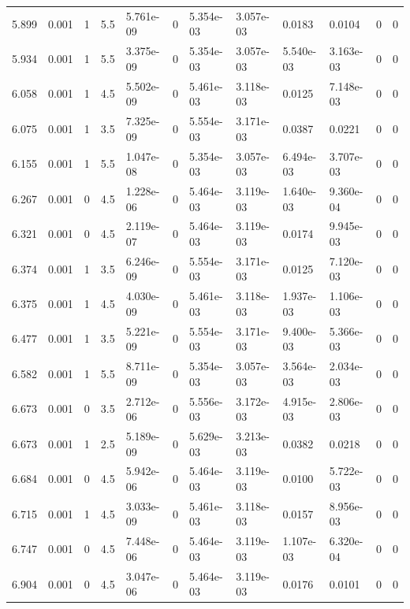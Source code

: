\documentclass[preview]{standalone}
\begin{document}
{{{\begin{tabular}{L{1.2cm}C{1.2cm} C{0.3cm}C{0.5cm} C{1.4cm}C{1.4cm} C{1.4cm}C{1.4cm} C{1.6cm}C{1.6cm} C{1.6cm}C{1.6cm}}
  5.899  &  0.001  & 1     & 5.5 &  5.761e-09  & 0  &  5.354e-03&   3.057e-03& 0.0183 & 0.0104   &  0 & 0  \\ 
  5.934  &  0.001  & 1     & 5.5 &  3.375e-09  & 0  &  5.354e-03&   3.057e-03& 5.540e-03 & 3.163e-03   &  0 & 0  \\ 
  6.058  &  0.001  & 1     & 4.5 &  5.502e-09  & 0  &  5.461e-03&   3.118e-03& 0.0125 & 7.148e-03   &  0 & 0  \\ 
  6.075  &  0.001  & 1     & 3.5 &  7.325e-09  & 0  &  5.554e-03&   3.171e-03& 0.0387 & 0.0221   &  0 & 0  \\ 
  6.155  &  0.001  & 1     & 5.5 &  1.047e-08  & 0  &  5.354e-03&   3.057e-03& 6.494e-03 & 3.707e-03   &  0 & 0  \\ 
  6.267  &  0.001  & 0     & 4.5 &  1.228e-06  & 0  &  5.464e-03&   3.119e-03& 1.640e-03 & 9.360e-04   &  0 & 0  \\ 
  6.321  &  0.001  & 0     & 4.5 &  2.119e-07  & 0  &  5.464e-03&   3.119e-03& 0.0174 & 9.945e-03   &  0 & 0  \\ 
  6.374  &  0.001  & 1     & 3.5 &  6.246e-09  & 0  &  5.554e-03&   3.171e-03& 0.0125 & 7.120e-03   &  0 & 0  \\ 
  6.375  &  0.001  & 1     & 4.5 &  4.030e-09  & 0  &  5.461e-03&   3.118e-03& 1.937e-03 & 1.106e-03   &  0 & 0  \\ 
  6.477  &  0.001  & 1     & 3.5 &  5.221e-09  & 0  &  5.554e-03&   3.171e-03& 9.400e-03 & 5.366e-03   &  0 & 0  \\ 
  6.582  &  0.001  & 1     & 5.5 &  8.711e-09  & 0  &  5.354e-03&   3.057e-03& 3.564e-03 & 2.034e-03   &  0 & 0  \\ 
  6.673  &  0.001  & 0     & 3.5 &  2.712e-06  & 0  &  5.556e-03&   3.172e-03& 4.915e-03 & 2.806e-03   &  0 & 0  \\ 
  6.673  &  0.001  & 1     & 2.5 &  5.189e-09  & 0  &  5.629e-03&   3.213e-03& 0.0382 & 0.0218   &  0 & 0  \\ 
  6.684  &  0.001  & 0     & 4.5 &  5.942e-06  & 0  &  5.464e-03&   3.119e-03& 0.0100 & 5.722e-03   &  0 & 0  \\ 
  6.715  &  0.001  & 1     & 4.5 &  3.033e-09  & 0  &  5.461e-03&   3.118e-03& 0.0157 & 8.956e-03   &  0 & 0  \\ 
  6.747  &  0.001  & 0     & 4.5 &  7.448e-06  & 0  &  5.464e-03&   3.119e-03& 1.107e-03 & 6.320e-04   &  0 & 0  \\ 
  6.904  &  0.001  & 0     & 4.5 &  3.047e-06  & 0  &  5.464e-03&   3.119e-03& 0.0176 & 0.0101   &  0 & 0  \\ 

\end{tabular}}}}
\end{document}
